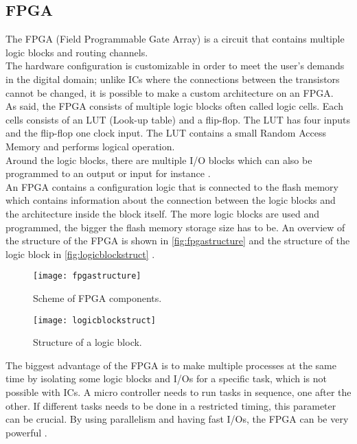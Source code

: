\subsection{FPGA}


The FPGA (Field Programmable Gate Array) is a circuit that contains multiple logic blocks and routing channels.\\
The hardware configuration is customizable in order to meet the user’s demands in the digital domain; unlike ICs where the connections between the transistors cannot be changed, it is possible to make a custom architecture on an FPGA.  \\
As said, the FPGA consists of multiple logic blocks often called logic cells. Each cells consists of an LUT (Look-up table) and a flip-flop. The LUT has four inputs and the flip-flop one clock input. The LUT contains a small Random Access Memory and performs logical operation. \\
Around the logic blocks, there are multiple I/O blocks which can also be programmed to an output or input for instance \citep {FPGA_youtube} \citep{FPGA_center} \citep{FPGA_toronto}.  \\
An FPGA contains a configuration logic that is connected to the flash memory which contains information about the connection between the logic blocks and the architecture inside the block itself. The more logic blocks are used and programmed, the bigger the flash memory storage size has to be. An overview of the structure of the FPGA is shown in \autoref{fig:fpgastructure} and the structure of the logic block in \autoref{fig:logicblockstruct} \citep {FPGA_youtube} \citep{FPGA_center} \citep{FPGA_toronto}.  \\
\newline

\begin{figure}[htbp]
	\centering
	\texttt{[image: fpgastructure]}
	\caption{Scheme of FPGA components.}
	\label{fig:fpgastructure}
\end{figure}

\begin{figure}[htbp]
	\centering
	\texttt{[image: logicblockstruct]}
	\caption{Structure of a logic block.}
	\label{fig:logicblockstruct}
\end{figure}


The biggest advantage of the FPGA is to make multiple processes at the same time by isolating some logic blocks and I/Os for a specific task, which is not possible with ICs. A micro controller needs to run tasks in sequence, one after the other. If different tasks needs to be done in a restricted timing, this parameter can be crucial. 
By using parallelism and having fast I/Os, the FPGA can be very powerful \citep {FPGA_youtube} \citep{FPGA_center} \citep{FPGA_toronto}. \\

